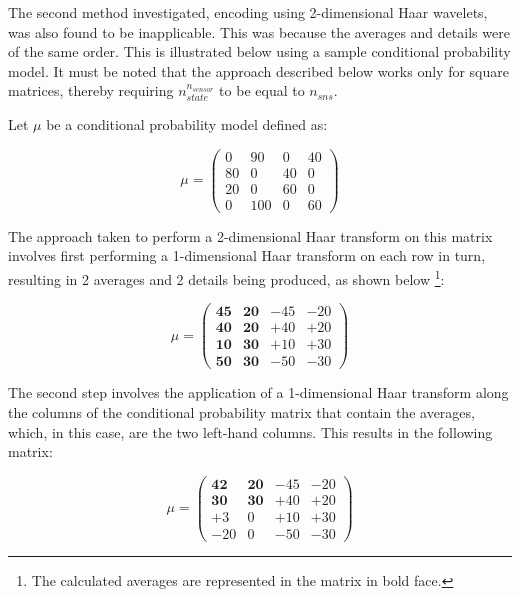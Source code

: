 \documentclass{sig-alternate-10pt}
\begin{document}
The second method investigated, encoding using 2-dimensional Haar wavelets, was also found to be inapplicable. This was because the averages and details were of the same order. This is illustrated below using a sample conditional probability model. It must be noted that the approach described below works only for square matrices, thereby requiring $n_{state}^{n_{sensor}}$ to be equal to $n_{sns}$.

Let $\mu$ be a conditional probability model defined as:

\begin{equation*}
\mu = \left( \begin{array}{cccc}
0 & 90 & 0 & 40 \\
80 & 0 & 40 & 0 \\
20 & 0 & 60 & 0 \\
0 & 100 & 0 & 60 \end{array}
 \right)
\end{equation*}

The approach taken to perform a 2-dimensional Haar transform on this matrix involves first performing a 1-dimensional Haar transform on each row in turn, resulting in 2 averages and 2 details being produced, as shown below \footnote{The calculated averages are represented in the matrix in bold face.}:

\begin{equation*}
\mu = \left( \begin{array}{cccc}
\textbf{45} & \textbf{20} & -45 & -20 \\
\textbf{40} & \textbf{20} & +40 & +20 \\
\textbf{10} & \textbf{30} & +10 & +30 \\
\textbf{50} & \textbf{30} & -50 & -30 \end{array}
 \right)
\end{equation*}

The second step involves the application of a 1-dimensional Haar transform along the columns of the conditional probability matrix that contain the averages, which, in this case, are the two left-hand columns. This results in the following matrix:

\begin{equation*}
\mu = \left( \begin{array}{cccc}
\textbf{42} & \textbf{20} & -45 & -20 \\
\textbf{30} & \textbf{30} & +40 & +20 \\
+3 & 0 & +10 & +30 \\
-20 & 0 & -50 & -30 \end{array}
 \right)
\end{equation*}
\end{document}
